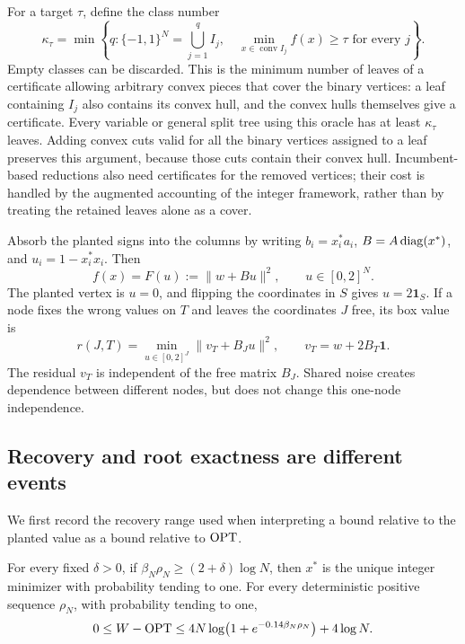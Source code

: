 For a target $\tau$, define the class number
\begin{equation}
 \kappa_\tau=\min\left\{q:
   \{-1,1\}^N=\bigcup_{j=1}^q I_j,\quad
   \min_{x\in\operatorname{conv} I_j}f(x)\ge\tau
   \text{ for every }j\right\}.
 \label{bls:class-number}
\end{equation}
Empty classes can be discarded.  This is the minimum number of leaves of
a certificate allowing arbitrary convex pieces that cover the binary
vertices: a leaf containing $I_j$ also contains its convex hull, and the
convex hulls themselves give a certificate.  Every variable or general
split tree using this oracle has at least $\kappa_\tau$ leaves.  Adding
convex cuts valid for all the binary vertices assigned to a leaf preserves this
argument, because those cuts contain their convex hull.  Incumbent-based
reductions also need certificates for the removed vertices; their cost is
handled by the augmented accounting of the integer framework, rather than
by treating the retained leaves alone as a cover.

Absorb the planted signs into the columns by writing
$b_i=x_i^*a_i$, $B=A\operatorname{diag}(x^*)$, and
$u_i=1-x_i^*x_i$.  Then
\begin{equation}
 f(x)=F(u):=\|w+Bu\|^2,\qquad u\in[0,2]^N.
 \label{bls:error-coordinates}
\end{equation}
The planted vertex is $u=0$, and flipping the coordinates in $S$ gives
$u=2\mathbf 1_S$.  If a node fixes the wrong values on $T$ and leaves the
coordinates $J$ free, its box value is
\begin{equation}
 r(J,T)=\min_{u\in[0,2]^J}\|v_T+B_Ju\|^2,
 \qquad v_T=w+2B_T\mathbf 1.
 \label{bls:node-equation}
\end{equation}
The residual $v_T$ is independent of the free matrix $B_J$.  Shared noise
creates dependence between different nodes, but does not change this
one-node independence.

\subsection{Recovery and root exactness are different events}
\label{bls:recovery-root}

We first record the recovery range used when interpreting a bound relative
to the planted value as a bound relative to $\operatorname{OPT}$.

\begin{proposition}
\label{bls:ml}
For every fixed $\delta>0$, if
$\beta_N\rho_N\ge(2+\delta)\log N$, then $x^*$ is the unique integer
minimizer with probability tending to one.  For every deterministic
positive sequence $\rho_N$, with probability tending to one,
\begin{equation}
 0\le W-\operatorname{OPT}\le
 4N\log\bigl(1+e^{-0.14\beta_N\rho_N}\bigr)+4\log N.
 \label{bls:ml-value-gap}
\end{equation}
\end{proposition}

